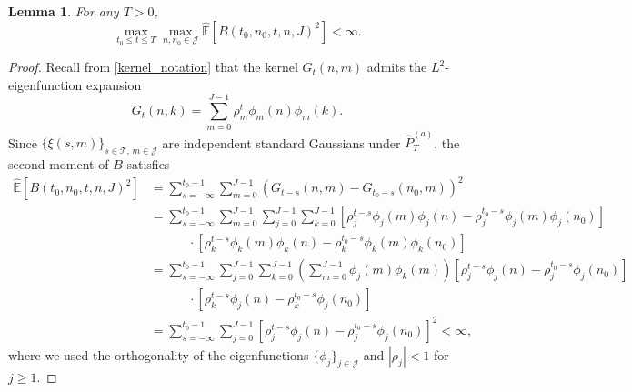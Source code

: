 \documentclass[12pt]{amsart}
\newtheorem{lemma}{Lemma}[section]
\numberwithin{equation}{section}
\newcommand{\E}{\mathbb{E}}
\newcommand{\1}{\mathbf{1}}
\begin{document}
\begin{lemma}
    For any $T>0$,
    \begin{equation*}
        \max_{t_0\leq t\leq T}\max_{n,n_0\in\mathcal{J}}\widehat{\E}\left[B(t_0,n_0,t,n,J)^2\right]<\infty.
    \end{equation*}
\end{lemma}
\begin{proof}
Recall from \eqref{kernel_notation} that the kernel $G_t(n,m)$ admits the $L^2$-eigenfunction expansion
\begin{equation*}
    G_t(n,k) = \sum_{m=0}^{J-1}\rho_m^t\phi_m(n)\phi_m(k).
\end{equation*}
Since $\{\xi(s,m)\}_{s\in\mathcal{T},\,m\in\mathcal{J}}$ are independent standard Gaussians under $\widehat{P}_T^{(a)}$, the second moment of $B$ satisfies
    \begin{equation*}
    \begin{split}
        \widehat{\E}\left[B(t_0,n_0,t,n,J)^2\right] &= \sum_{s=-\infty}^{t_0-1}\sum_{m=0}^{J-1}\left(G_{t-s}(n,m)-G_{t_0-s}(n_0,m)\right)^2\\
        &=\sum_{s=-\infty}^{t_0-1}\sum_{m=0}^{J-1}\sum_{j=0}^{J-1}\sum_{k=0}^{J-1}\left[\rho_j^{t-s}\phi_j(m)\phi_j(n)-\rho_j^{t_0-s}\phi_j(m)\phi_j(n_0)\right]\\
        &\qquad\quad\cdot\left[\rho_k^{t-s}\phi_k(m)\phi_k(n)-\rho_k^{t_0-s}\phi_k(m)\phi_k(n_0)\right]\\
        &=\sum_{s=-\infty}^{t_0-1}\sum_{j=0}^{J-1}\sum_{k=0}^{J-1}\left(\sum_{m=0}^{J-1}\phi_j(m)\phi_k(m)\right)\left[\rho_j^{t-s}\phi_j(n)-\rho_j^{t_0-s}\phi_j(n_0)\right]\\
        &\qquad\quad\cdot\left[\rho_k^{t-s}\phi_j(n)-\rho_k^{t_0-s}\phi_j(n_0)\right]\\
        &=\sum_{s=-\infty}^{t_0-1}\sum_{j=0}^{J-1}\left[\rho_j^{t-s}\phi_j(n)-\rho_j^{t_0-s}\phi_j(n_0)\right]^2<\infty,
        \end{split}
    \end{equation*}
where we used the orthogonality of the eigenfunctions $\{\phi_j\}_{j\in\mathcal{J}}$ and $|\rho_j|<1$ for $j\geq 1$.
\end{proof}
\end{document}
